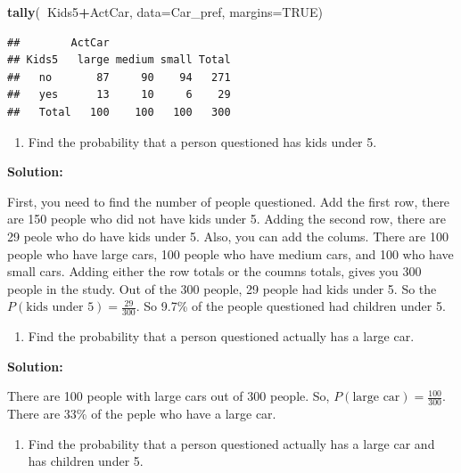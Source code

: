 \documentclass[
]{book}
\newenvironment{Shaded}{\begin{snugshade}}{\end{snugshade}}
\newcommand{\DataTypeTok}[1]{\textcolor[rgb]{0.13,0.29,0.53}{#1}}
\newcommand{\KeywordTok}[1]{\textcolor[rgb]{0.13,0.29,0.53}{\textbf{#1}}}
\newcommand{\NormalTok}[1]{#1}
\newcommand{\OperatorTok}[1]{\textcolor[rgb]{0.81,0.36,0.00}{\textbf{#1}}}
\newcommand{\OtherTok}[1]{\textcolor[rgb]{0.56,0.35,0.01}{#1}}
\providecommand{\tightlist}{%
  \setlength{\itemsep}{0pt}\setlength{\parskip}{0pt}}
\begin{document}
\begin{Shaded}
\begin{Highlighting}[]
\KeywordTok{tally}\NormalTok{(}\OperatorTok{~}\NormalTok{Kids5}\OperatorTok{+}\NormalTok{ActCar, }\DataTypeTok{data=}\NormalTok{Car_pref, }\DataTypeTok{margins=}\OtherTok{TRUE}\NormalTok{)}
\end{Highlighting}
\end{Shaded}

\begin{verbatim}
##        ActCar
## Kids5   large medium small Total
##   no       87     90    94   271
##   yes      13     10     6    29
##   Total   100    100   100   300
\end{verbatim}

\begin{enumerate}
\def\labelenumi{\alph{enumi}.}
\tightlist
\item
  Find the probability that a person questioned has kids under 5.
\end{enumerate}

\textbf{Solution: }

First, you need to find the number of people questioned. Add the first row, there are 150 people who did not have kids under 5. Adding the second row, there are 29 peole who do have kids under 5. Also, you can add the colums. There are 100 people who have large cars, 100 people who have medium cars, and 100 who have small cars. Adding either the row totals or the coumns totals, gives you 300 people in the study. Out of the 300 people, 29 people had kids under 5. So the \(P(\text{kids under 5})=\frac{29}{300}\). So 9.7\% of the people questioned had children under 5.

\begin{enumerate}
\def\labelenumi{\alph{enumi}.}
\setcounter{enumi}{1}
\tightlist
\item
  Find the probability that a person questioned actually has a large car.
\end{enumerate}

\textbf{Solution:}

There are 100 people with large cars out of 300 people. So, \(P(\text{large car})= \frac{100}{300}\). There are 33\% of the peple who have a large car.

\begin{enumerate}
\def\labelenumi{\alph{enumi}.}
\setcounter{enumi}{2}
\tightlist
\item
  Find the probability that a person questioned actually has a large car and has children under 5.
\end{enumerate}
\end{document}
